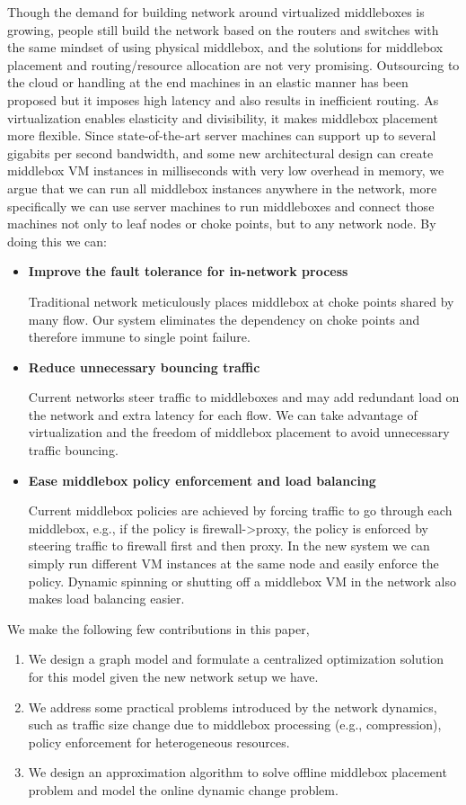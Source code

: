 \documentclass[twocolumn]{article}
\begin{document}
Though the demand for building network around virtualized middleboxes is growing, people still build the network based on the routers and switches with the same mindset of using physical middlebox, and the solutions for middlebox placement and routing/resource allocation are not very promising. Outsourcing to the cloud or handling at the end machines in an elastic manner has been proposed but it imposes high latency and also results in inefficient routing\cite{APLOMB2012, ANANTA2013}. As virtualization enables elasticity and divisibility, it makes middlebox placement more flexible. Since state-of-the-art server machines can support up to several gigabits per second bandwidth, and some new architectural design can create middlebox VM instances in milliseconds with very low overhead in memory\cite{clickos}, we argue that we can run all middlebox instances anywhere in the network, more specifically we can use server machines to run middleboxes and connect those machines not only to leaf nodes or choke points, but to any network node. By doing this we can: 
\begin{itemize}
\item \textbf{Improve the fault tolerance for in-network process} 

Traditional network meticulously places middlebox at choke points shared by many flow. Our system eliminates the dependency on choke points and therefore immune to single point failure. 
\item \textbf{Reduce unnecessary bouncing traffic} 
 
Current networks steer traffic to middleboxes and may add redundant load on the network and extra latency for each flow. We can take advantage of virtualization and the freedom of middlebox placement to avoid unnecessary traffic bouncing.  
\item \textbf{Ease middlebox policy enforcement and load balancing}

Current middlebox policies are achieved by forcing traffic to go through each middlebox, e.g., if the policy is firewall->proxy, the policy is enforced by steering traffic to firewall first and then proxy. In the new system we can simply run different VM instances at the same node and easily enforce the policy. Dynamic spinning or shutting off a middlebox VM in the network also makes load balancing easier.
\end{itemize} 
We make the following few contributions in this paper, 
\begin{enumerate}
\item We design a graph model and formulate a centralized optimization solution for this model given the new network setup we have.
\item We address some practical problems introduced by the network dynamics, such as traffic size change due to middlebox processing (e.g., compression), policy enforcement for heterogeneous resources.  
\item We design an approximation algorithm to solve offline middlebox placement problem and model the online dynamic change problem.

\end{enumerate}
\end{document}
